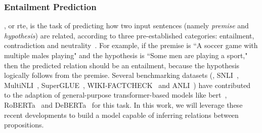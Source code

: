 \subsubsection{Entailment Prediction} , or \gls{rte}, is the task of predicting how two input sentences (namely \textit{premise} and \textit{hypothesis}) are related, according to three pre-established categories: entailment, contradiction and neutrality~\cite{maccartney2008modeling}. For example, if the premise is ``A soccer game with multiple males playing" and the hypothesis is ``Some men are playing a sport," then the predicted relation should be an entailment, because the hypothesis logically follows from the premise. Several benchmarking datasets (\eg, SNLI~\cite{young2014image}, MultiNLI~\cite{williams2017broad}, SuperGLUE~\cite{wang2019superglue}, WIKI-FACTCHECK~\cite{sathe2020automated} and ANLI~\cite{nie2019adversarial}) have contributed to the adaption of general-purpose transformer-based models like \gls{bert}~\cite{devlin2018bert}, RoBERTa~\cite{liu2019roberta} and DeBERTa~\cite{he2020deberta} for this task. In this work, we will leverage these recent developments to build a model capable of inferring relations between propositions.